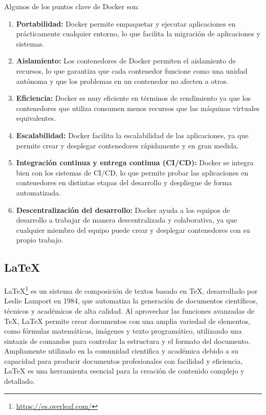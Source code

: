 \documentclass[a4paper, 12pt]{book}
\begin{document}
Algunos de los puntos clave de Docker son:

\begin{enumerate}
  \item \textbf{Portabilidad:} Docker permite empaquetar y ejecutar aplicaciones en prácticamente cualquier entorno, lo que facilita la migración de aplicaciones y sistemas.
  \item \textbf{Aislamiento:} Los contenedores de Docker permiten el aislamiento de recursos, lo que garantiza que cada contenedor funcione como una unidad autónoma y que los problemas en un contenedor no afecten a otros.
  \item \textbf{Eficiencia:} Docker es muy eficiente en términos de rendimiento ya que los contenedores que utiliza consumen menos recursos que las máquinas virtuales equivalentes.
  \item \textbf{Escalabilidad:} Docker facilita la escalabilidad de las aplicaciones, ya que permite crear y desplegar contenedores rápidamente y en gran medida.
  \item \textbf{Integración continua y entrega continua (CI/CD):} Docker se integra bien con los sistemas de CI/CD, lo que permite probar las aplicaciones en contenedores en distintas etapas del desarrollo y despliegue de forma automatizada.
  \item \textbf{Descentralización del desarrollo:} Docker ayuda a los equipos de desarrollo a trabajar de manera descentralizada y colaborativa, ya que cualquier miembro del equipo puede crear y desplegar contenedores con su propio trabajo. 
\end{enumerate}

\subsection{LaTeX}
\label{subsec:LaTeX}
LaTeX\footnote{\url{https://es.overleaf.com/}} es un sistema de composición de textos basado en TeX, desarrollado por Leslie Lamport en 1984, que automatiza la generación de documentos científicos, técnicos y académicos de alta calidad. Al aprovechar las funciones avanzadas de TeX, LaTeX permite crear documentos con una amplia variedad de elementos, como fórmulas matemáticas, imágenes y texto programático, utilizando una sintaxis de comandos para controlar la estructura y el formato del documento. Ampliamente utilizado en la comunidad científica y académica debido a su capacidad para producir documentos profesionales con facilidad y eficiencia, LaTeX es una herramienta esencial para la creación de contenido complejo y detallado.
\end{document}
